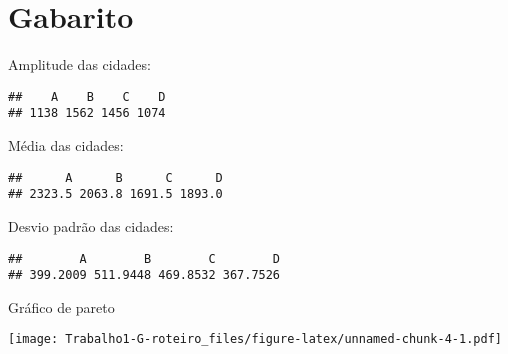 \documentclass[]{article}
\begin{document}
\section{Gabarito}\label{gabarito}

Amplitude das cidades:

\begin{verbatim}
##    A    B    C    D 
## 1138 1562 1456 1074
\end{verbatim}

Média das cidades:

\begin{verbatim}
##      A      B      C      D 
## 2323.5 2063.8 1691.5 1893.0
\end{verbatim}

Desvio padrão das cidades:

\begin{verbatim}
##        A        B        C        D 
## 399.2009 511.9448 469.8532 367.7526
\end{verbatim}

Gráfico de pareto

\texttt{[image: Trabalho1-G-roteiro\_files/figure-latex/unnamed-chunk-4-1.pdf]}\\
\end{document}
